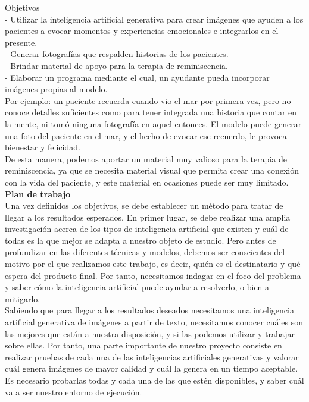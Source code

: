Objetivos\\

- Utilizar la inteligencia artificial generativa para crear imágenes que ayuden a los pacientes a evocar momentos y experiencias emocionales e integrarlos en el presente.\\
- Generar fotografías que respalden historias de los pacientes.\\
- Brindar material de apoyo para la terapia de reminiscencia.\\
- Elaborar un programa mediante el cual, un ayudante pueda incorporar imágenes propias al modelo.\\

Por ejemplo: un paciente recuerda cuando vio el mar por primera vez, pero no conoce detalles suficientes como para tener integrada una historia que contar en la mente, ni tomó ninguna fotografía en aquel entonces. El modelo puede generar una foto del paciente en el mar, y el hecho de evocar ese recuerdo, le provoca bienestar y felicidad.\\

De esta manera, podemos aportar un material muy valioso para la terapia de reminiscencia, ya que se necesita material visual que permita crear una conexión con la vida del paciente, y este material en ocasiones puede ser muy limitado.\\

\textbf{Plan de trabajo}\\

Una vez definidos los objetivos, se debe establecer un método para tratar de llegar a los resultados esperados. En primer lugar, se debe realizar una amplia investigación acerca de los tipos de inteligencia artificial que existen y cuál de todas es la que mejor se adapta a nuestro objeto de estudio. Pero antes de profundizar en las diferentes técnicas y modelos, debemos ser conscientes del motivo por el que realizamos este trabajo, es decir, quién es el destinatario y qué espera del producto final. Por tanto, necesitamos indagar en el foco del problema y saber cómo la inteligencia artificial puede ayudar a resolverlo, o bien a mitigarlo. \\

Sabiendo que para llegar a los resultados deseados necesitamos una inteligencia artificial generativa de imágenes a partir de texto, necesitamos conocer cuáles son las mejores que están a nuestra disposición, y si las podemos utilizar y trabajar sobre ellas. Por tanto, una parte importante de nuestro proyecto consiste en realizar pruebas de cada una de las inteligencias artificiales generativas y valorar cuál genera imágenes de mayor calidad y cuál la genera en un tiempo aceptable. Es necesario probarlas todas y cada una de las que estén disponibles, y saber cuál va a ser nuestro entorno de ejecución.\\

